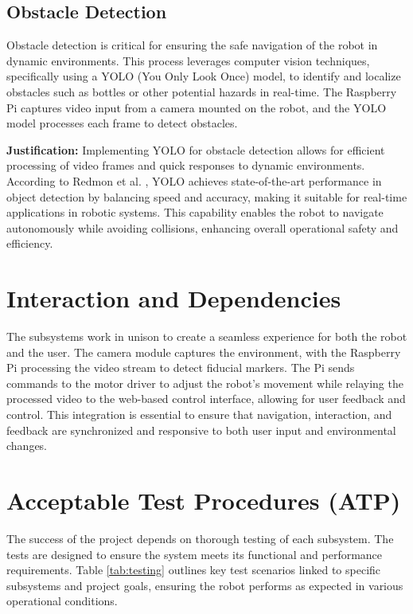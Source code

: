 \subsection{\label{subsec} Obstacle Detection} 
Obstacle detection is critical for ensuring the safe navigation of the robot in dynamic environments. This process leverages computer vision techniques, specifically using a YOLO (You Only Look Once) model, to identify and localize obstacles such as bottles or other potential hazards in real-time. The Raspberry Pi captures video input from a camera mounted on the robot, and the YOLO model processes each frame to detect obstacles.

\textbf{Justification:} Implementing YOLO for obstacle detection allows for efficient processing of video frames and quick responses to dynamic environments. According to Redmon et al. \cite{redmon2015}, YOLO achieves state-of-the-art performance in object detection by balancing speed and accuracy, making it suitable for real-time applications in robotic systems. This capability enables the robot to navigate autonomously while avoiding collisions, enhancing overall operational safety and efficiency.


\section{\label{sec:interaction} Interaction and Dependencies}
The subsystems work in unison to create a seamless experience for both the robot and the user. The camera module captures the environment, with the Raspberry Pi processing the video stream to detect fiducial markers. The Pi sends commands to the motor driver to adjust the robot’s movement while relaying the processed video to the web-based control interface, allowing for user feedback and control. This integration is essential to ensure that navigation, interaction, and feedback are synchronized and responsive to both user input and environmental changes.

\section{\label{sec:atp} Acceptable Test Procedures (ATP)}
The success of the project depends on thorough testing of each subsystem. The tests are designed to ensure the system meets its functional and performance requirements. Table \ref{tab:testing} outlines key test scenarios linked to specific subsystems and project goals, ensuring the robot performs as expected in various operational conditions.

